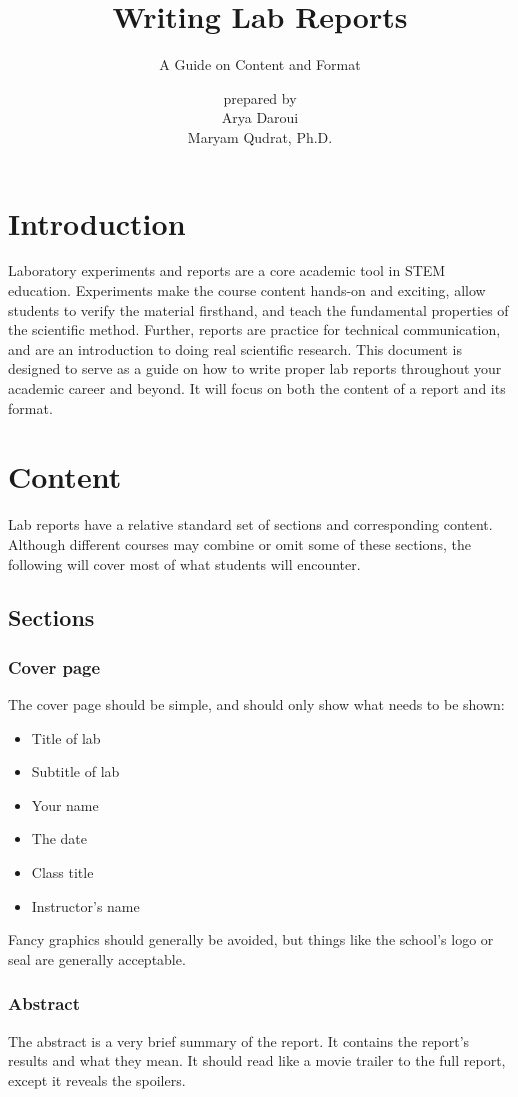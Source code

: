 \documentclass{bannerReport}
\title{Writing Lab Reports}
\subtitle{A Guide on Content and Format}
\author{ {\small prepared by} \\ Arya Daroui \\ Maryam Qudrat, Ph.D.}
\begin{document}
 \sloppy

	\section{Introduction}
		Laboratory experiments and reports are a core academic tool in STEM education. Experiments make the course content hands-on and exciting, allow students to verify the material firsthand, and teach the fundamental properties of the scientific method. Further, reports are practice for technical communication, and are an introduction to doing real scientific research. This document is designed to serve as a guide on how to write proper lab reports throughout your academic career and beyond. It will focus on both the content of a report and its format.

	\section{Content}
		Lab reports have a relative standard set of sections and corresponding content. Although different courses may combine or omit some of these sections, the following will cover most of what students will encounter.

		\subsection{Sections}
			\subsubsection{Cover page}
				The cover page should be simple, and should only show what needs to be shown:
				\begin{itemize}
					\item Title of lab
					\item Subtitle of lab
					\item Your name
					\item The date
					\item Class title
					\item Instructor's name
				\end{itemize}
				Fancy graphics should generally be avoided, but things like the school’s logo or seal are generally acceptable.

			\subsubsection{Abstract}
				The abstract is a very brief summary of the report. It contains the report’s results and what they mean. It should read like a movie trailer to the full report, except it reveals the spoilers.
\end{document}

